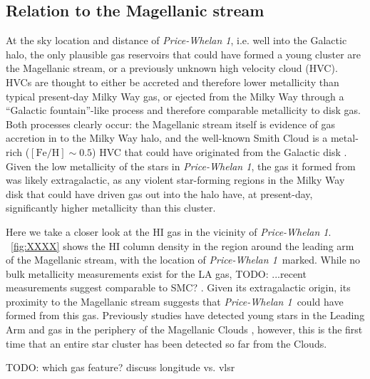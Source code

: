 \documentclass[twocolumn]{aastex62}
\newcommand{\todo}[1]{{\color{red} TODO: #1}}
\newcommand{\feh}{\ensuremath{[\textrm{Fe} / \textrm{H}]}}
\newcommand{\vlsr}{$V_{\rm LSR}~$}
\newcommand{\hi}{H{\footnotesize I} }
\newcommand{\clustername}{\textsl{Price-Whelan 1}}
\begin{document}
\subsection{Relation to the Magellanic stream}
\label{sec:higas}

At the sky location and distance of \clustername, i.e. well into the Galactic halo, the only plausible gas reservoirs that could have formed a young cluster are the Magellanic stream, or a previously unknown high velocity cloud (HVC).
HVCs are thought to either be accreted and therefore lower metallicity than typical present-day Milky Way gas, or ejected from the Milky Way through a ``Galactic fountain''-like process and therefore comparable metallicity to disk gas.
Both processes clearly occur: the Magellanic stream itself is evidence of gas accretion in to the Milky Way halo, and the well-known Smith Cloud \citep{TODO} is a metal-rich ($\feh \sim 0.5$) HVC that could have originated from the Galactic disk \citep{TODO}.
Given the low metallicity of the stars in \clustername, the gas it formed from was likely extragalactic, as any violent star-forming regions in the Milky Way disk that could have driven gas out into the halo have, at present-day, significantly higher metallicity than this cluster.

Here we take a closer look at the \hi gas in the vicinity of \clustername.
\figurename~\ref{fig:XXXX} shows the \hi column density in the region around the leading arm of the Magellanic stream, with the location of \clustername\ marked.
While no bulk metallicity measurements exist for the LA gas, \todo{...recent measurements suggest comparable to SMC?} \citep{Fox:2018}.
Given its extragalactic origin, its proximity to the Magellanic stream suggests that \clustername\ could have formed from this gas.
Previously studies have detected young stars in the Leading Arm and gas in the periphery of the Magellanic Clouds \citep{Casetti-Dinescu:2014, MoniBidin:2017}, however, this is the first time that an entire star cluster has been detected so far from the Clouds.

\todo{which gas feature? discuss longitude vs. vlsr}

\end{document}
